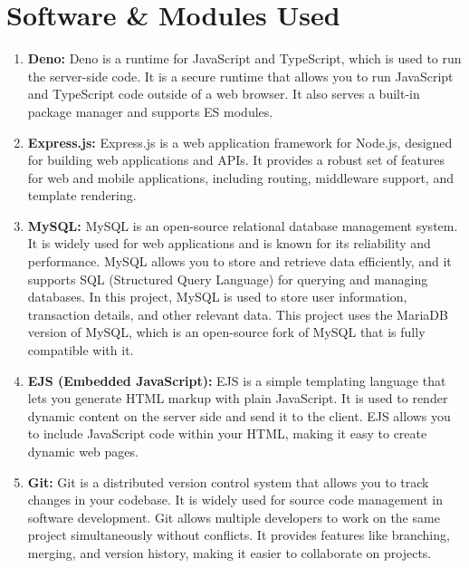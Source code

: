 \documentclass[12pt,a4paper]{report}
\begin{document}
\chapter{Software \& Modules Used}

\begin{enumerate}
    \item \textbf{Deno:}
    Deno is a runtime for JavaScript and TypeScript, which is used to run the
    server-side code. It is a secure runtime that allows you to run JavaScript
    and TypeScript code outside of a web browser. It also serves a built-in
    package manager and supports ES modules.

    \item \textbf{Express.js:}
    Express.js is a web application framework for Node.js, designed for
    building web applications and APIs. It provides a robust set of features
    for web and mobile applications, including routing, middleware support, and
    template rendering.

    \item \textbf{MySQL:}
    MySQL is an open-source relational database management system. It is widely
    used for web applications and is known for its reliability and performance.
    MySQL allows you to store and retrieve data efficiently, and it supports
    SQL (Structured Query Language) for querying and managing databases. In
    this project, MySQL is used to store user information, transaction details,
    and other relevant data. This project uses the MariaDB version of MySQL,
    which is an open-source fork of MySQL that is fully compatible with it.

    \item \textbf{EJS (Embedded JavaScript):}
    EJS is a simple templating language that lets you generate HTML markup with
    plain JavaScript. It is used to render dynamic content on the server side
    and send it to the client. EJS allows you to include JavaScript code within
    your HTML, making it easy to create dynamic web pages.

    \item \textbf{Git:}
    Git is a distributed version control system that allows you to track
    changes in your codebase. It is widely used for source code management in
    software development. Git allows multiple developers to work on the same
    project simultaneously without conflicts. It provides features like
    branching, merging, and version history, making it easier to collaborate on
    projects.


\end{enumerate}
\end{document}
